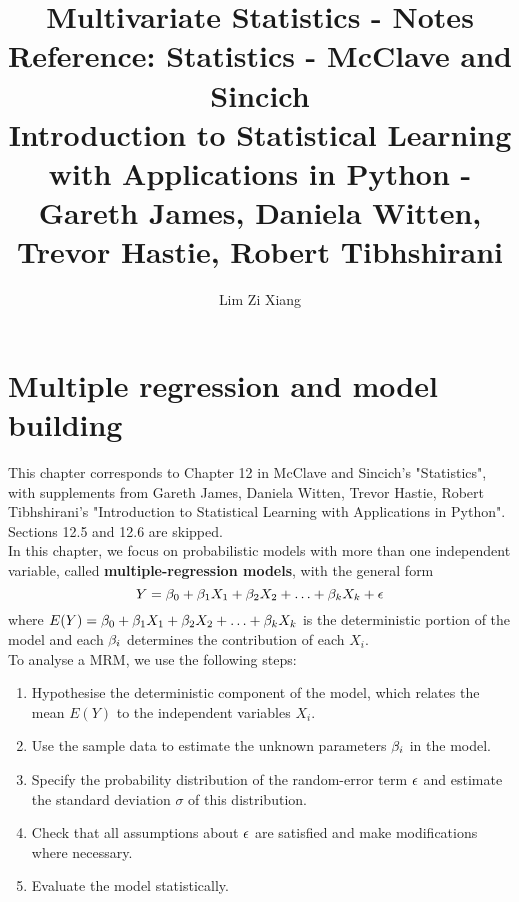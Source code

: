 \documentclass{report}
\title{\textbf{{\LARGE Multivariate Statistics - Notes}}\\ {\small Reference: Statistics - McClave and Sincich\\
Introduction to Statistical Learning with Applications in Python - Gareth James, Daniela Witten, Trevor Hastie, Robert Tibhshirani}}
\author{Lim Zi Xiang}
\date{}
\begin{document}
	
	\chapter{Multiple regression and model building}
	This chapter corresponds to Chapter 12 in McClave and Sincich's "Statistics", with supplements from Gareth James, Daniela Witten, Trevor Hastie, Robert Tibhshirani's "Introduction to Statistical Learning with Applications in Python". Sections 12.5 and 12.6 are skipped.\\
	
	In this chapter, we focus on probabilistic models with more than one independent variable, called \textbf{multiple-regression models}, with the general form
	$$Y=\beta_0+\beta_1X_1+\beta_2X_2+\ldots+\beta_kX_k+\epsilon$$
	where $E(Y)=\beta_0+\beta_1X_1+\beta_2X_2+\ldots+\beta_kX_k$ is the deterministic portion of the model and each $\beta_i$ determines the contribution of each $X_i$.\\
	
	To analyse a MRM, we use the following steps:
	\begin{enumerate}
		\item Hypothesise the deterministic component of the model, which relates the mean $E(Y)$ to the independent variables $X_i$. 
		\item Use the sample data to estimate the unknown parameters $\beta_i$ in the model.
		\item Specify the probability distribution of the random-error term $\epsilon$ and estimate the standard deviation $\sigma$ of this distribution.
		\item Check that all assumptions about $\epsilon$ are satisfied and make modifications where necessary.
		\item Evaluate the model statistically.\\
	\end{enumerate}
	
	
\end{document}
